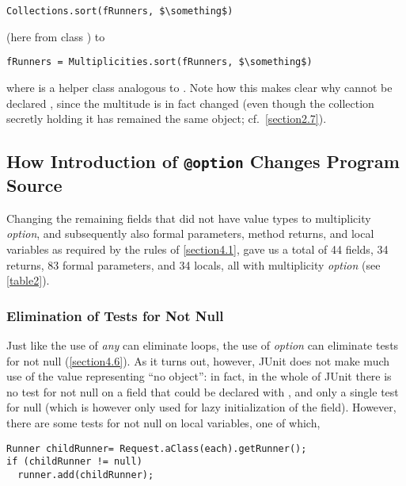 {\begin{lstlisting}
Collections.sort(fRunners, $\something$)
\end{lstlisting}

\noindent (here from class ) to

\begin{lstlisting}
fRunners = Multiplicities.sort(fRunners, $\something$)
\end{lstlisting}

\noindent where  is a helper class analogous to
. Note how this makes clear why  cannot be
declared , since the multitude is in fact changed (even though
the collection secretly holding it has remained the same object; cf.~\autoref{section2.7}).

\subsection{How Introduction of \texttt{@option} Changes Program Source}
\label{section6.2}

\noindent Changing the remaining fields that did not have value types to
multiplicity \emph{option}, and subsequently also formal parameters,
method returns, and local variables as required by the rules of \autoref{section4.1},
gave us a total of 44 fields, 34 returns, 83 formal parameters, and 34
locals, all with multiplicity \emph{option} (see \autoref{table2}).

\subsubsection{Elimination of Tests for Not Null}
\label{section6.2.1}

\noindent Just like the use of \emph{any} can eliminate loops, the use
of \emph{option} can eliminate tests for not null (\autoref{section4.6}). As it
turns out, however, JUnit does not make much use of the value 
representing ``no object'': in fact, in the whole of JUnit there is no
test for not null on a field that could be declared with , and
only a single test for null (which is however only used for lazy
initialization of the field). However, there are some tests for not null on
local variables, one of which,

\begin{lstlisting}
Runner childRunner= Request.aClass(each).getRunner();
if (childRunner != null)
  runner.add(childRunner);
\end{lstlisting}

}
